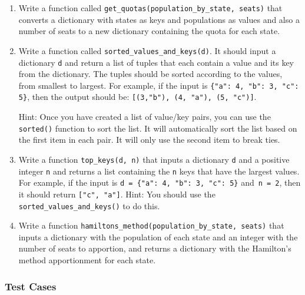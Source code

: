 \documentclass[11pt]{article}
\begin{document}
\begin{enumerate}
\item Write a function called \verb|get_quotas(population_by_state, seats)| that converts a dictionary with states as keys and populations as values and also a number of seats to a new dictionary containing the quota for each state. %

\item Write a function called \verb|sorted_values_and_keys(d)|.  It should input a dictionary \verb|d| and return a list of tuples that each contain a value and its key from the dictionary. The tuples should be sorted according to the values, from smallest to largest. For example, if the input is \verb|{"a": 4, "b": 3, "c": 5}|, then the output should be: \verb|[(3,"b"), (4, "a"), (5, "c")]|.

Hint: Once you have created a list of value/key pairs, you can use the \verb|sorted()| function to sort the list.  It will automatically sort the list based on the first item in each pair. It will only use the second item to break ties.  

\item Write a function \verb|top_keys(d, n)| that inputs a dictionary \verb|d| and a positive integer \verb|n| and returns a list containing the \verb|n| keys that have the largest values. For example, if the input is \verb|d = {"a": 4, "b": 3, "c": 5}| and\ \verb|n = 2|, then it should return \verb|["c", "a"]|.  Hint: You should use the \verb|sorted_values_and_keys()| to do this. 

\item Write a function \verb|hamiltons_method(population_by_state, seats)| that inputs a dictionary with the population of each state and an integer with the number of seats to apportion, and returns a dictionary with the Hamilton's method apportionment for each state.  



\end{enumerate}

\subsubsection*{Test Cases}
\end{document}
